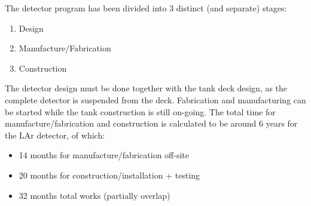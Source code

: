 The detector program has been divided into 3 distinct (and separate) stages:
\begin{enumerate}
\item{Design}
\item{Manufacture/Fabrication} 
\item{Construction}
\end{enumerate}  

The detector design must be done together with the tank deck design,
as the complete detector is suspended from the deck.  Fabrication and
manufacturing can be started while the tank construction is still
on-going.  The total time for manufacture/fabrication and construction
is calculated to be around 6 years for the LAr detector, of which:
\begin{itemize}
\item{14 months		for manufacture/fabrication off-site}
\item{20 months		for construction/installation + testing}
\item{32 months		total works (partially overlap)}
\end{itemize}
